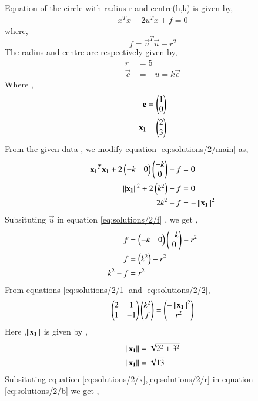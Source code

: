 
Equation of the circle with radius r and centre(h,k) is given by,
\begin{align}
    x^Tx+2u^Tx+f=0\label{eq:solutions/2/main}
\end{align}
where,
\begin{equation}
    f=\vec{u}^T\vec{u}-r^2\label{eq:solutions/2/f}
\end{equation}
The radius and centre are respectively given by,
\begin{align}
    r&=5\label{eq:solutions/2/r}\\
    \vec{c}&=-u=k\vec{e}\label{eq:solutions/2/cc}
\end{align}
Where , 
\begin{align}
\mathbf{e}=\begin{pmatrix}1 \\ 0\end{pmatrix}\\
\mathbf{x_1}=\begin{pmatrix}2 \\ 3\end{pmatrix}\label{eq:solutions/2/x}
\end{align}
From the given data , we modify equation \ref{eq:solutions/2/main} as,
\begin{align}
    \mathbf{x_1}^T\mathbf{x_1}+2\begin{pmatrix}-k & 0\end{pmatrix}\begin{pmatrix}-k \\ 0\end{pmatrix}+f&=0\\
    \left\lVert\mathbf{x_1}\right\rVert^2+2\begin{pmatrix}k^2\end{pmatrix}+f&=0\\
    2k^2+f&=-\left\lVert\mathbf{x_1}\right\rVert^2\label{eq:solutions/2/1}
\end{align}
Subsituting $\vec{u}$ in equation \ref{eq:solutions/2/f} , we get ,
\begin{align}
    f&=\begin{pmatrix}-k & 0\end{pmatrix}\begin{pmatrix}-k\\0\end{pmatrix}-r^2\\
    f&=\begin{pmatrix}k^2\end{pmatrix}-r^2\\
    k^2-f&=r^2\label{eq:solutions/2/2}
\end{align}
From equations \ref{eq:solutions/2/1} and \ref{eq:solutions/2/2},
\begin{align}
    \begin{pmatrix}2 & 1\\ 1 & -1\end{pmatrix}\begin{pmatrix}k^2 \\ f\end{pmatrix}=\begin{pmatrix}-\left\lVert\mathbf{x_1}\right\rVert^2\\r^2\end{pmatrix}\label{eq:solutions/2/b}
\end{align}
Here ,$\left\lVert\mathbf{x_1}\right\rVert$ is given by ,
\begin{align}
    \norm{\vec{x_1}}&=\sqrt{2^2+3^2}\\
    \norm{\vec{x_1}}&=\sqrt{13}%
\end{align}
Subsituting equation \ref{eq:solutions/2/x},\ref{eq:solutions/2/r} in equation \ref{eq:solutions/2/b} we get ,
